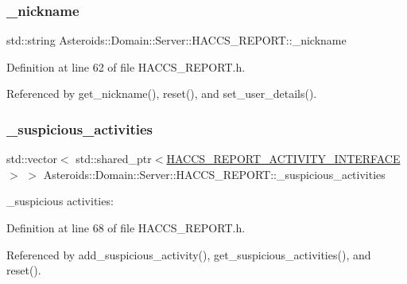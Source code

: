 \subsubsection{\texorpdfstring{\+\_\+nickname}{\_nickname}}
{\footnotesize\ttfamily std\+::string Asteroids\+::\+Domain\+::\+Server\+::\+H\+A\+C\+C\+S\+\_\+\+R\+E\+P\+O\+R\+T\+::\+\_\+nickname\hspace{0.3cm}{\ttfamily [private]}}



Definition at line 62 of file H\+A\+C\+C\+S\+\_\+\+R\+E\+P\+O\+R\+T.\+h.



Referenced by get\+\_\+nickname(), reset(), and set\+\_\+user\+\_\+details().

\mbox{\label{classAsteroids_1_1Domain_1_1Server_1_1HACCS__REPORT_a33852dfe8d5f96befa05626c374c23d0}} 
\subsubsection{\texorpdfstring{\+\_\+suspicious\+\_\+activities}{\_suspicious\_activities}}
{\footnotesize\ttfamily std\+::vector$<$ std\+::shared\+\_\+ptr$<$\hyperlink{classAsteroids_1_1Domain_1_1Server_1_1HACCS__REPORT__ACTIVITY__INTERFACE}{H\+A\+C\+C\+S\+\_\+\+R\+E\+P\+O\+R\+T\+\_\+\+A\+C\+T\+I\+V\+I\+T\+Y\+\_\+\+I\+N\+T\+E\+R\+F\+A\+CE}$>$ $>$ Asteroids\+::\+Domain\+::\+Server\+::\+H\+A\+C\+C\+S\+\_\+\+R\+E\+P\+O\+R\+T\+::\+\_\+suspicious\+\_\+activities\hspace{0.3cm}{\ttfamily [private]}}



\+\_\+suspicious activities\+: 



Definition at line 68 of file H\+A\+C\+C\+S\+\_\+\+R\+E\+P\+O\+R\+T.\+h.



Referenced by add\+\_\+suspicious\+\_\+activity(), get\+\_\+suspicious\+\_\+activities(), and reset().


